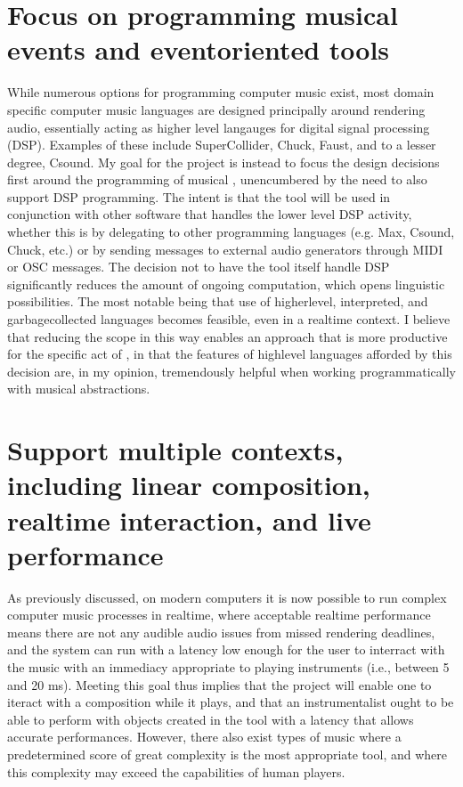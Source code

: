 \documentclass[letterpaper,10pt,english]{sphinxmanual}
\begin{document}
\section{Focus on programming musical events and event\sphinxhyphen{}oriented tools}
\label{\detokenize{goals:focus-on-programming-musical-events-and-event-oriented-tools}}
\sphinxAtStartPar
While numerous options for programming computer music exist, most domain specific computer music languages are
designed principally around rendering audio, essentially acting as higher level langauges for digital signal processing (DSP).
Examples of these include SuperCollider, Chuck, Faust, and to a lesser degree, Csound.
My goal for the project is instead to focus the design decisions first around the programming of musical ,
unencumbered by the need to also support DSP programming.
The intent is that the tool will be used in conjunction with other software that handles the lower level DSP activity,
whether this is by delegating to other programming languages (e.g. Max, Csound, Chuck, etc.)
or by sending messages to external audio generators through MIDI or OSC messages.
The decision not to have the tool itself handle DSP
significantly reduces the amount of ongoing computation, which opens linguistic possibilities.
The most notable being that use of higher\sphinxhyphen{}level, interpreted, and garbage\sphinxhyphen{}collected languages becomes feasible,
even in a realtime context.
I believe that reducing the scope in this way enables an approach that is more productive
for the specific act of , in that the features of high\sphinxhyphen{}level languages afforded by this decision
are, in my opinion, tremendously helpful when working programmatically with musical abstractions.


\section{Support multiple contexts, including linear composition, realtime interaction, and live performance}
\label{\detokenize{goals:support-multiple-contexts-including-linear-composition-realtime-interaction-and-live-performance}}
\sphinxAtStartPar
As previously discussed, on modern computers it is now possible to run complex computer music processes in realtime,
where acceptable realtime performance means there are not any audible audio issues from missed rendering deadlines, and the system can run with a
latency low enough for the user to interract with the music with an immediacy appropriate to playing instruments (i.e., between 5 and 20 ms).
Meeting this goal thus implies that the project will enable one to iteract with a composition while it plays,
and that an instrumentalist ought to be able to perform with objects created in the tool with a latency that allows accurate performances.
However, there also exist types of music where a predetermined score of great complexity is the most
appropriate tool, and where this complexity may exceed the capabilities of human players.
\end{document}
